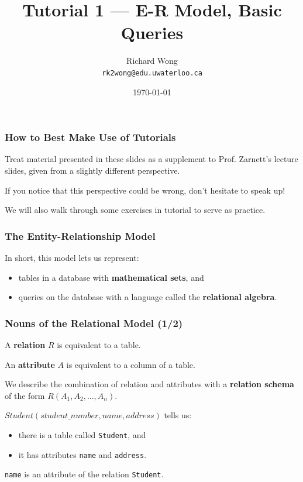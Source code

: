 

\title{Tutorial 1 --- E-R Model, Basic Queries}

\author{Richard Wong \\ \small \texttt{rk2wong@edu.uwaterloo.ca}}
\date{\today}




\begin{frame}
  \titlepage

\end{frame}


\begin{frame}
\frametitle{How to Best Make Use of Tutorials}

Treat material presented in these slides as a supplement to Prof. Zarnett's lecture slides, given from a slightly different perspective.

If you notice that this perspective could be wrong, don't hesitate to speak up!

We will also walk through some exercises in tutorial to serve as practice.

\end{frame}

\begin{frame}
\frametitle{The Entity-Relationship Model}

In short, this model lets us represent:\\
\begin{itemize}
  \item tables in a database with \textbf{mathematical sets}, and
  \item queries on the database with a language called the \textbf{relational algebra}.
\end{itemize}

\end{frame}


\begin{frame}
\frametitle{Nouns of the Relational Model (1/2)}

A \textbf{relation} $R$ is equivalent to a table.

An \textbf{attribute} $A$ is equivalent to a column of a table.

We describe the combination of relation and attributes with a \textbf{relation schema} of the form $R(A_1, A_2, ... , A_n)$.

$Student(student\_number, name, address)$ tells us:\\
\begin{itemize}
  \item there is a table called \texttt{Student}, and
  \item it has attributes \texttt{name} and \texttt{address}.
\end{itemize}

\texttt{name} is an attribute of the relation \texttt{Student}.

\end{frame}

